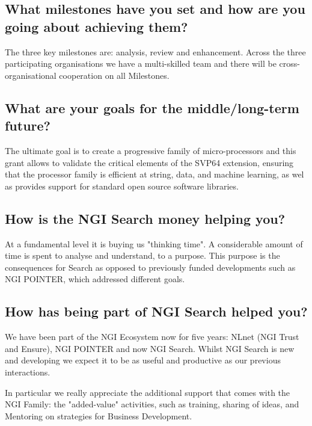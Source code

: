 \subsection{What milestones have you set and how are you going about achieving them?}

The three key milestones are: analysis, review and enhancement.
Across the three participating organisations we have a multi-skilled
team and there will be cross-organisational cooperation on all Milestones.

\subsection{What are your goals for the middle/long-term future?}

The ultimate goal is to create a progressive family of micro-processors
and this grant allows to validate the critical elements of the
\acrshort{SVP64} extension, ensuring that the processor family is efficient at string,
data, and machine learning, as wel as provides support for standard open
source software libraries.

\subsection{How is the \acrshort{NGI} Search money helping you?}

At a fundamental level it is buying us "thinking time".
A considerable amount of time is spent to analyse and understand,
to a purpose. This purpose is the consequences for Search as
opposed to previously funded developments such as \acrshort{NGI} POINTER,
which addressed different goals.

\subsection{How has being part of \acrshort{NGI} Search helped you?}

We have been part of the \acrshort{NGI} Ecosystem now for five years:
NLnet (\acrshort{NGI} Trust and Ensure), \acrshort{NGI} POINTER and now \acrshort{NGI} Search.
Whilst \acrshort{NGI} Search is new and developing we expect it to be as
useful and productive as our previous interactions.

In particular we really appreciate the additional support that
comes with the \acrshort{NGI} Family: the "added-value" activities, such
as training, sharing of ideas, and Mentoring on strategies for
Business Development.

